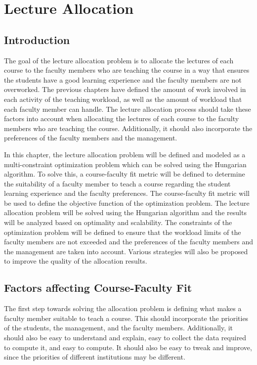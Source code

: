 
\chapter{Lecture Allocation}

\section{Introduction}

The goal of the lecture allocation problem is to allocate the lectures of each course to the faculty members who are teaching the course in a way that ensures the students have a good learning experience and the faculty members are not overworked. The previous chapters have defined the amount of work involved in each activity of the teaching workload, as well as the amount of workload that each faculty member can handle. The lecture allocation process should take these factors into account when allocating the lectures of each course to the faculty members who are teaching the course. Additionally, it should also incorporate the preferences of the faculty members and the management.

In this chapter, the lecture allocation problem will be defined and modeled as a multi-constraint optimization problem which can be solved using the Hungarian algorithm. To solve this, a course-faculty fit metric will be defined to determine the suitability of a faculty member to teach a course regarding the student learning experience and the faculty preferences. The course-faculty fit metric will be used to define the objective function of the optimization problem. The lecture allocation problem will be solved using the Hungarian algorithm and the results will be analyzed based on optimality and scalability. The constraints of the optimization problem will be defined to ensure that the workload limits of the faculty members are not exceeded and the preferences of the faculty members and the management are taken into account. Various strategies will also be proposed to improve the quality of the allocation results.

\section{Factors affecting Course-Faculty Fit}

The first step towards solving the allocation problem is defining what makes a faculty member suitable to teach a course. This should incorporate the priorities of the students, the management, and the faculty members. Additionally, it should also be easy to understand and explain, easy to collect the data required to compute it, and easy to compute. It should also be easy to tweak and improve, since the priorities of different institutions may be different.



